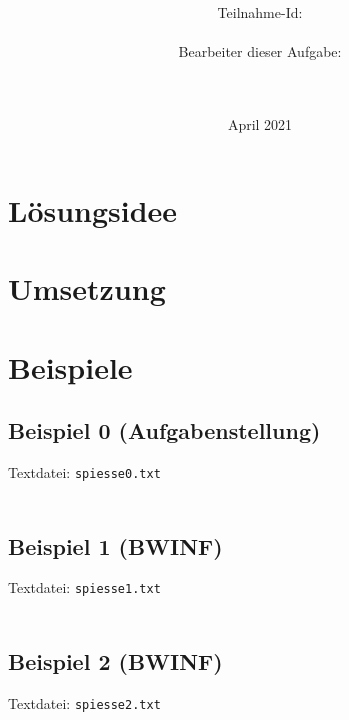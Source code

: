 \documentclass[a4paper,10pt,ngerman]{scrartcl}
\title{\textbf{\Huge\Aufgabe}}
\author{\LARGE Teilnahme-Id: \LARGE \TeilnahmeId \\\\
	    \LARGE Bearbeiter dieser Aufgabe: \\ 
	    \LARGE \Namen\\\\}
\date{\LARGE April 2021}
\begin{document}
\maketitle
\tableofcontents

\vspace{0.5cm}

\section{Lösungsidee}

\section{Umsetzung}

\section{Beispiele}


\subsection{Beispiel 0 (Aufgabenstellung)}\label{example:0}
Textdatei: \texttt{spiesse0.txt}\\

\noindent
{}\\

\noindent
{}


\subsection{Beispiel 1 (BWINF)}\label{example:1}
Textdatei: \texttt{spiesse1.txt}\\

\noindent
{}\\

\noindent
{}

\subsection{Beispiel 2 (BWINF)}\label{example:2}
Textdatei: \texttt{spiesse2.txt}\\

\noindent
{}\\

\noindent
{}
\end{document}
